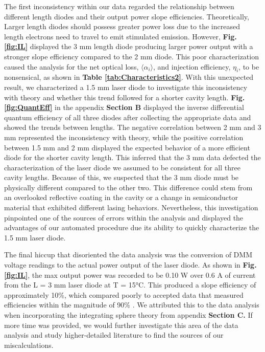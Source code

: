 \documentclass[9pt,twocolumn,twoside]{osajnl}
\begin{document}
The first inconsistency within our data regarded the relationship between different length diodes and their output power slope efficiencies. Theoretically, Larger length diodes should possess greater power loss due to the increased length electrons need to travel to emit stimulated emission. However, \textbf{Fig. \ref{fig:IL}} displayed the 3 mm length diode producing larger power output with a stronger slope efficiency compared to the 2 mm diode. This poor characterization caused the analysis for the net optical loss, $\langle \alpha_i \rangle$, and injection efficiency, $\eta_i$, to be nonsensical, as shown in \textbf{Table \ref{tab:Characteristics2}}. With this unexpected result, we characterized a 1.5 mm laser diode to investigate this inconsistency with theory and whether this trend followed for a shorter cavity length. \textbf{Fig. \ref{fig:QuantEff}} in the appendix \textbf{Section B} displayed the inverse differential quantum efficiency of all three diodes after collecting the appropriate data and showed the trends between lengths. The negative correlation between 2 mm and 3 mm represented the inconsistency with theory, while the positive correlation between 1.5 mm and 2 mm displayed the expected behavior of a more efficient diode for the shorter cavity length. This inferred that the 3 mm data defected the characterization of the laser diode we assumed to be consistent for all three cavity lengths. Because of this, we suspected that the 3 mm diode must be physically different compared to the other two. This difference could stem from an overlooked reflective coating in the cavity or a change in semiconductor material that exhibited different lasing behaviors. Nevertheless, this investigation pinpointed one of the sources of errors within the analysis and displayed the advantages of our automated procedure due its ability to quickly characterize the 1.5 mm laser diode. 

The final hiccup that disoriented the data analysis was the conversion of DMM voltage readings to the actual power output of the laser diode. As shown in \textbf{Fig. \ref{fig:IL}}, the max output power was recorded to be 0.10 W over 0.6 A of current from the L = 3 mm laser diode at T = 15°C. This produced a slope efficiency of approximately 10\%, which compared poorly to accepted data that measured efficiencies within the magnitude of 90\% \cite{paul}. We attributed this to the data analysis when incorporating the integrating sphere theory from appendix \textbf{Section C.} If more time was provided, we would further investigate this area of the data analysis and study higher-detailed literature to find the sources of our miscalculations.
\end{document}
